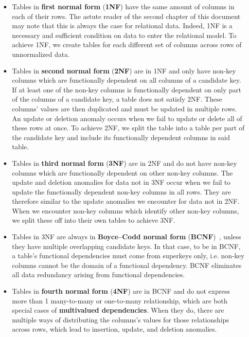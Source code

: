 \begin{itemize}
\item Tables in \textbf{first normal form} (\textbf{1NF}) have the same amount of columns in each of their rows. The astute reader of the second chapter of this document may note that this is always the case for relational data. Indeed, 1NF is a necessary and sufficient condition on data to enter the relational model. To achieve 1NF, we create tables for each different set of columns across rows of unnormalized data.
\item Tables in \textbf{second normal form} (\textbf{2NF}) are in 1NF and only have non-key columns which are functionally dependent on all columns of a candidate key. If at least one of the non-key columns is functionally dependent on only part of the columns of a candidate key, a table does not satisfy 2NF. These columns' values are then duplicated and must be updated in multiple rows. An update or deletion anomaly occurs when we fail to update or delete all of these rows at once. To achieve 2NF, we split the table into a table per part of the candidate key and include its functionally dependent columns in said table.
\item Tables in \textbf{third normal form} (\textbf{3NF}) are in 2NF and do not have non-key columns which are functionally dependent on other non-key columns. The update and deletion anomalies for data not in 3NF occur when we fail to update the functionally dependent non-key columns in all rows. They are therefore similar to the update anomalies we encounter for data not in 2NF. When we encounter non-key columns which identify other non-key columns, we split these off into their own tables to achieve 3NF.
\item Tables in 3NF are always in \textbf{Boyce--Codd normal form} (\textbf{BCNF})~\citep{DBLP:conf/sigmod/Heath71}, unless they have multiple overlapping candidate keys. In that case, to be in BCNF, a table's functional dependencies must come from superkeys only, i.e. non-key columns cannot be the domain of a functional dependency. BCNF eliminates all data redundancy arising from functional dependencies.
\item Tables in \textbf{fourth normal form} (\textbf{4NF}) are in BCNF and do not express more than 1 many-to-many or one-to-many relationship, which are both special cases of \textbf{multivalued dependencies}. When they do, there are multiple ways of distributing the columns's values for those relationships across rows, which lead to insertion, update, and deletion anomalies.

\end{itemize}
